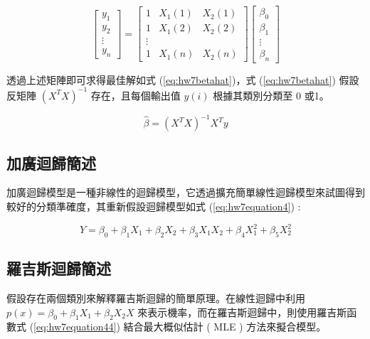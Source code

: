 $$ \left[
       \begin{array}{clr}
            y_1 \\
            y_2 \\
            \vdots \\
            y_n
       \end{array} \right] = \left[
       \begin{array}{clr}
            1 & X_1(1) & X_2(1)\\
            1 & X_1(2) & X_2(2)\\
            \vdots \\
            1 & X_1(n) & X_2(n)
       \end{array}\right] \left[
       \begin{array}{clr}
            \beta_0 \\
            \beta_1 \\
            \vdots \\
            \beta_n 
       \end{array}\right] $$ 
       
透過上述矩陣即可求得最佳解如式 (\ref{eq:hw7betahat})，式 (\ref{eq:hw7betahat}) 假設反矩陣 $(X^{T}X)^{-1}$ 存在，且每個輸出值 $y(i)$ 根據其類別分類至 0 或1。

\begin{equation}\label{eq:hw7betahat}
\hat{\beta}=(X^{T}X)^{-1}X^{T}y
\end{equation}


\subsection{加廣迴歸簡述}

加廣迴歸模型是一種非線性的迴歸模型，它透過擴充簡單線性迴歸模型來試圖得到較好的分類準確度，其重新假設迴歸模型如式 (\ref{eq:hw7equation4}) :

\begin{equation}\label{eq:hw7equation4}
Y = \beta_0 + \beta_1 X_1 + \beta_2 X_2 + \beta_3 X_1 X_2 + \beta_4 X_1^{2} + \beta_5 X_2^{2}
\end{equation}


\subsection{羅吉斯迴歸簡述}

假設存在兩個類別來解釋羅吉斯迴歸的簡單原理。在線性迴歸中利用 $p(x)=\beta_0+\beta_1 X_1 + \beta_2 X_2 X$ 來表示機率，而在羅吉斯迴歸中，則使用羅吉斯函數式 (\ref{eq:hw7equation44}) 結合最大概似估計 ( MLE ) 方法來擬合模型。

